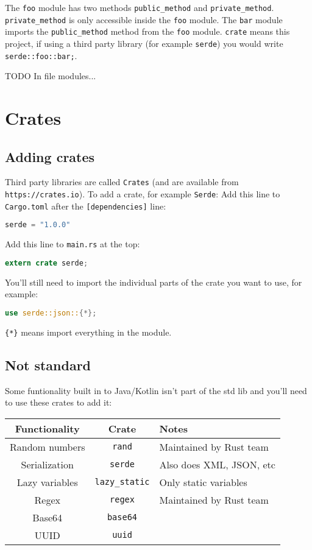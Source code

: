 \documentclass[a4paper,11pt]{article}
\begin{document}
The \lstinline{foo} module has two methods \lstinline{public_method} and \lstinline{private_method}. \lstinline{private_method} is only accessible inside the \lstinline{foo} module.
The \lstinline{bar} module imports the \lstinline{public_method} method from the \lstinline{foo} module.
\newline
\lstinline{crate} means this project, if using a third party library (for example \lstinline{serde}) you would write \lstinline{serde::foo::bar;}.

TODO
In file modules...

\newpage
\section{Crates}
\subsection{Adding crates}
Third party libraries are called \lstinline{Crates} (and are available from \lstinline{https://crates.io}). To add a crate, for example \lstinline{Serde}: 
Add this line to \lstinline{Cargo.toml} after the \lstinline{[dependencies]} line:
\begin{lstlisting}[language=Rust,frame=single]
serde = "1.0.0"
\end{lstlisting}
Add this line to \lstinline{main.rs} at the top:
\begin{lstlisting}[language=Rust,frame=single]
extern crate serde;
\end{lstlisting}

You'll still need to import the individual parts of the crate you want to use, for example:
\begin{lstlisting}[language=Rust,frame=single]
use serde::json::{*};
\end{lstlisting}
\lstinline|{*}| means import everything in the module.

\subsection{Not standard}
Some funtionality built in to Java/Kotlin isn't part of the std lib and you'll need to use these crates to add it:

\renewcommand{\arraystretch}{1.3}

\begin{center}
\begin{tabular}{ c|c|l } 

 Functionality & Crate & Notes \\ 
 \hline
 Random numbers & \lstinline|rand| & Maintained by Rust team \\
 Serialization & \lstinline|serde| & Also does XML, JSON, etc \\
 Lazy variables & \lstinline|lazy_static| & Only static variables \\
 Regex & \lstinline|regex| & Maintained by Rust team \\
 Base64 & \lstinline|base64| & \\
 UUID & \lstinline|uuid| & \\
 
\end{tabular}
\end{center}
\end{document}
